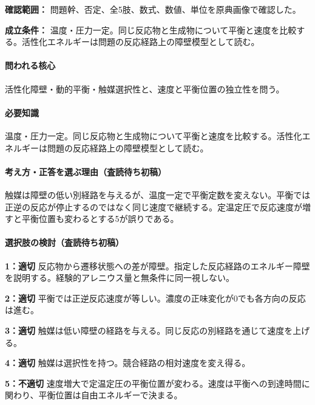 \noindent\textbf{確認範囲：} 問題幹、否定、全5肢、数式、数値、単位を原典画像で確認した。\par

\noindent\textbf{成立条件：} 温度・圧力一定。同じ反応物と生成物について平衡と速度を比較する。活性化エネルギーは問題の反応経路上の障壁模型として読む。\par

\paragraph{問われる核心} 活性化障壁・動的平衡・触媒選択性と、速度と平衡位置の独立性を問う。

\paragraph{必要知識} 温度・圧力一定。同じ反応物と生成物について平衡と速度を比較する。活性化エネルギーは問題の反応経路上の障壁模型として読む。

\paragraph{考え方・正答を選ぶ理由（査読待ち初稿）} 触媒は障壁の低い別経路を与えるが、温度一定で平衡定数を変えない。平衡では正逆の反応が停止するのではなく同じ速度で継続する。定温定圧で反応速度が増すと平衡位置も変わるとする5が誤りである。

\paragraph{選択肢の検討（査読待ち初稿）}\mbox{}\par

\noindent\textbf{1：適切} 反応物から遷移状態への差が障壁。指定した反応経路のエネルギー障壁を説明する。経験的アレニウス量と無条件に同一視しない。\par

\noindent\textbf{2：適切} 平衡では正逆反応速度が等しい。濃度の正味変化が0でも各方向の反応は進む。\par

\noindent\textbf{3：適切} 触媒は低い障壁の経路を与える。同じ反応の別経路を通じて速度を上げる。\par

\noindent\textbf{4：適切} 触媒は選択性を持つ。競合経路の相対速度を変え得る。\par

\noindent\textbf{5：不適切} 速度増大で定温定圧の平衡位置が変わる。速度は平衡への到達時間に関わり、平衡位置は自由エネルギーで決まる。\par

